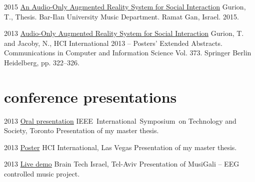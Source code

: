\documentclass[]{friggeri-cv}  %
\begin{document}
\begin{entrylist}

    \entry
    {2015}
    {\href{http://www.tomgurion.me/pdfs/Gurion - An Audio-Only Augmented Reality System for Social Interaction.pdf}{An Audio-Only Augmented Reality System for Social Interaction}}
    {}
    {Gurion, T., Thesis. Bar-Ilan University Music Department. Ramat Gan, Israel. 2015.}

\end{entrylist}

\begin{entrylist}

    \entry
    {2013}
    {\href{http://www.tomgurion.me/pdfs/Gurion and Jacoby - Audio-Only Augmented Reality System for Social Interaction.pdf}{Audio-Only Augmented Reality System for Social Interaction}}
    {}
    {Gurion, T. and Jacoby, N., HCI International 2013 -- Posters’ Extended Abstracts. Communications in Computer and Information Science Vol. 373. Springer Berlin Heidelberg, pp. 322–326.}

\end{entrylist}


\section{conference presentations}

\begin{entrylist}

    \entry
    {2013}
    {\href{http://www.slideshare.net/Nagasaki45/audioonly-augmented-reality-system-for-social-interaction}{Oral presentation}}
    {IEEE International Symposium on Technology and Society, Toronto}
    {Presentation of my master thesis.}

\end{entrylist}
\begin{entrylist}

    \entry
    {2013}
    {\href{https://db.tt/Rx7FnAxn}{Poster}}
    {HCI International, Las Vegas}
    {Presentation of my master thesis.}

\end{entrylist}
\begin{entrylist}

    \entry
    {2013}
    {\href{http://tomgurion.blogspot.co.il/2013/10/musigali-eeg-controlled-music-for-brain.html}{Live demo}}
    {Brain Tech Israel, Tel-Aviv}
    {Presentation of MusiGali -- EEG controlled music project.}

\end{entrylist}
\end{document}
